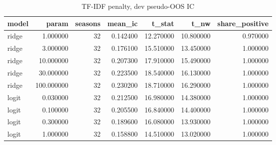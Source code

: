 \begin{table}
\caption{TF-IDF penalty, dev pseudo-OOS IC}
\label{tab:t7_tfidf_tuning}
\begin{tabular}{lrrrrrr}
\toprule
model & param & seasons & mean\_ic & t\_stat & t\_nw & share\_positive \\
\midrule
ridge & 1.000000 & 32 & 0.142400 & 12.270000 & 10.800000 & 0.970000 \\
ridge & 3.000000 & 32 & 0.176100 & 15.510000 & 13.450000 & 1.000000 \\
ridge & 10.000000 & 32 & 0.207300 & 17.910000 & 15.490000 & 1.000000 \\
ridge & 30.000000 & 32 & 0.223500 & 18.540000 & 16.130000 & 1.000000 \\
ridge & 100.000000 & 32 & 0.230200 & 18.710000 & 16.290000 & 1.000000 \\
logit & 0.030000 & 32 & 0.212500 & 16.980000 & 14.380000 & 1.000000 \\
logit & 0.100000 & 32 & 0.205500 & 16.840000 & 14.400000 & 1.000000 \\
logit & 0.300000 & 32 & 0.189600 & 16.080000 & 13.930000 & 1.000000 \\
logit & 1.000000 & 32 & 0.158800 & 14.510000 & 13.020000 & 1.000000 \\
\bottomrule
\end{tabular}
\end{table}
